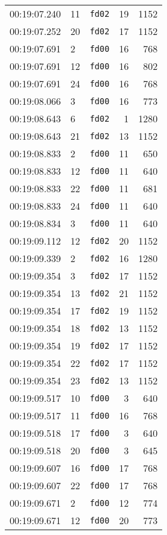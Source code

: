 \documentclass{article}
\begin{document}
\begin{longtable}{lllrr}
00:19:07.240 & 11 & \texttt{fd02} & 19 & 1152 \\
00:19:07.252 & 20 & \texttt{fd02} & 17 & 1152 \\
00:19:07.691 & 2 & \texttt{fd00} & 16 & 768 \\
00:19:07.691 & 12 & \texttt{fd00} & 16 & 802 \\
00:19:07.691 & 24 & \texttt{fd00} & 16 & 768 \\
00:19:08.066 & 3 & \texttt{fd00} & 16 & 773 \\
00:19:08.643 & 6 & \texttt{fd02} & 1 & 1280 \\
00:19:08.643 & 21 & \texttt{fd02} & 13 & 1152 \\
00:19:08.833 & 2 & \texttt{fd00} & 11 & 650 \\
00:19:08.833 & 12 & \texttt{fd00} & 11 & 640 \\
00:19:08.833 & 22 & \texttt{fd00} & 11 & 681 \\
00:19:08.833 & 24 & \texttt{fd00} & 11 & 640 \\
00:19:08.834 & 3 & \texttt{fd00} & 11 & 640 \\
00:19:09.112 & 12 & \texttt{fd02} & 20 & 1152 \\
00:19:09.339 & 2 & \texttt{fd02} & 16 & 1280 \\
00:19:09.354 & 3 & \texttt{fd02} & 17 & 1152 \\
00:19:09.354 & 13 & \texttt{fd02} & 21 & 1152 \\
00:19:09.354 & 17 & \texttt{fd02} & 19 & 1152 \\
00:19:09.354 & 18 & \texttt{fd02} & 13 & 1152 \\
00:19:09.354 & 19 & \texttt{fd02} & 17 & 1152 \\
00:19:09.354 & 22 & \texttt{fd02} & 17 & 1152 \\
00:19:09.354 & 23 & \texttt{fd02} & 13 & 1152 \\
00:19:09.517 & 10 & \texttt{fd00} & 3 & 640 \\
00:19:09.517 & 11 & \texttt{fd00} & 16 & 768 \\
00:19:09.518 & 17 & \texttt{fd00} & 3 & 640 \\
00:19:09.518 & 20 & \texttt{fd00} & 3 & 645 \\
00:19:09.607 & 16 & \texttt{fd00} & 17 & 768 \\
00:19:09.607 & 22 & \texttt{fd00} & 17 & 768 \\
00:19:09.671 & 2 & \texttt{fd00} & 12 & 774 \\
00:19:09.671 & 12 & \texttt{fd00} & 20 & 773 \\

\end{longtable}
\end{document}
